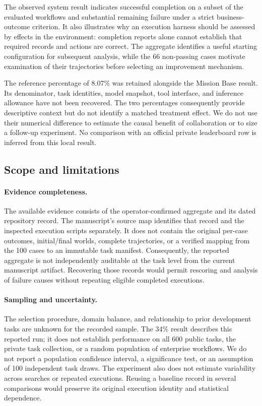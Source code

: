 The observed system result indicates successful completion on a subset of the evaluated workflows and substantial remaining failure under a strict business-outcome criterion. It also illustrates why an execution harness should be assessed by effects in the environment: completion reports alone cannot establish that required records and actions are correct. The aggregate identifies a useful starting configuration for subsequent analysis, while the 66 non-passing cases motivate examination of their trajectories before selecting an improvement mechanism.

The reference percentage of 8.07\% was retained alongside the Mission Base result. Its denominator, task identities, model snapshot, tool interface, and inference allowance have not been recovered. The two percentages consequently provide descriptive context but do not identify a matched treatment effect. We do not use their numerical difference to estimate the causal benefit of collaboration or to size a follow-up experiment. No comparison with an official private leaderboard row is inferred from this local result.

\subsection{Scope and limitations}
\paragraph{Evidence completeness.}
The available evidence consists of the operator-confirmed aggregate and its dated repository record. The manuscript's source map identifies that record and the inspected execution scripts separately. It does not contain the original per-case outcomes, initial/final worlds, complete trajectories, or a verified mapping from the 100 cases to an immutable task manifest. Consequently, the reported aggregate is not independently auditable at the task level from the current manuscript artifact. Recovering those records would permit rescoring and analysis of failure causes without repeating eligible completed executions.

\paragraph{Sampling and uncertainty.}
The selection procedure, domain balance, and relationship to prior development tasks are unknown for the recorded sample. The 34\% result describes this reported run; it does not establish performance on all 600 public tasks, the private task collection, or a random population of enterprise workflows. We do not report a population confidence interval, a significance test, or an assumption of 100 independent task draws. The experiment also does not estimate variability across searches or repeated executions. Reusing a baseline record in several comparisons would preserve its original execution identity and statistical dependence.

